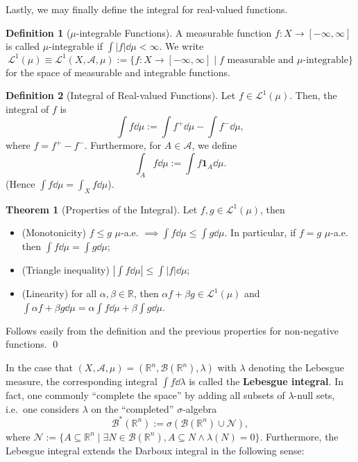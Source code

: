 \documentclass[
]{article}
\theoremstyle{definition}
\newtheorem{theorem}{Theorem}
\theoremstyle{definition}
\newtheorem{definition}{Definition}[section]
\begin{document}
Lastly, we may finally define the integral for real-valued functions.

\begin{definition}[\(\mu\)-integrable Functions]
  A measurable function \(f : X \to [-\infty, \infty]\) is called \(\mu\)-integrable 
  if \(\int |f| \dd \mu < \infty\). We write 
  \[\mathcal{L}^1(\mu) \equiv \mathcal{L}^1(X, \mathcal{A}, \mu) 
    := \{f : X \to [-\infty, \infty] \mid f \text{ measurable and } \mu \text{-integrable}\}\]
  for the space of measurable and integrable functions.
\end{definition}

\begin{definition}[Integral of Real-valued Functions]
  Let \(f \in \mathcal{L}^1(\mu)\). Then, the integral of \(f\) is 
  \[\int f \dd \mu := \int f^+ \dd \mu - \int f^- \dd \mu,\]
  where \(f = f^+ - f^-\). Furthermore, for \(A \in \mathcal{A}\), we define
  \[\int_A f \dd \mu := \int f \mathbf{1}_A \dd \mu.\]
  (Hence \(\int f \dd \mu = \int_X f \dd \mu\)).
\end{definition}

\begin{theorem}[Properties of the Integral]
  Let \(f, g \in \mathcal{L}^1(\mu)\), then 
  \begin{itemize}
    \item (Monotonicity) \(f \le g\) \(\mu\)-a.e. \(\implies \int f \dd \mu 
      \le \int g \dd \mu\). In particular, if \(f = g\) \(\mu\)-a.e. then 
      \(\int f \dd \mu = \int g \dd \mu\);
    \item (Triangle inequality) \(\left| \int f \dd \mu \right| \le \int |f| \dd \mu\);
    \item (Linearity) for all \(\alpha, \beta \in \mathbb{R}\), then 
      \(\alpha f + \beta g \in \mathcal{L}^1(\mu)\) and 
      \(\int \alpha f + \beta g \dd \mu = \alpha \int f \dd \mu + \beta \int g \dd \mu\).
  \end{itemize}
\end{theorem}
\proof

Follows easily from the definition and the previous properties for
non-negative functions. \qed

In the case that
\((X, \mathcal{A}, \mu) = (\mathbb{R}^n, \mathcal{B}(\mathbb{R}^n), \lambda)\)
with \(\lambda\) denoting the Lebesgue measure, the corresponding
integral \(\int f \dd \lambda\) is called the \textbf{Lebesgue
integral}. In fact, one commonly ``complete the space'' by adding all
subsets of \(\lambda\)-null sets, i.e.~one considers \(\lambda\) on the
``completed'' \(\sigma\)-algebra
\[\mathcal{B}^*(\mathbb{R}^n) := \sigma(\mathcal{B}(\mathbb{R}^n) \cup \mathcal{N}),\]
where
\(\mathcal{N} := \{A \subseteq \mathbb{R}^n \mid \exists N \in  \mathcal{B}(\mathbb{R}^n), A \subseteq N \wedge \lambda(N) = 0 \}\).
Furthermore, the Lebesgue integral extends the Darboux integral in the
following sense:
\end{document}
